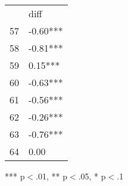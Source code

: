 \documentclass{article}
\begin{document}
\begin{table}[!h]
\centering
\begin{tabular}{ll}
\cline{1-2}
\multicolumn{1}{|l}{} &
  \multicolumn{1}{|l|}{diff} \\
\cline{1-2}
\multicolumn{1}{|l}{57} &
  \multicolumn{1}{|l|}{-0.60***} \\
\cline{1-2}
\multicolumn{1}{|l}{58} &
  \multicolumn{1}{|l|}{-0.81***} \\
\cline{1-2}
\multicolumn{1}{|l}{59} &
  \multicolumn{1}{|l|}{0.15***} \\
\cline{1-2}
\multicolumn{1}{|l}{60} &
  \multicolumn{1}{|l|}{-0.63***} \\
\cline{1-2}
\multicolumn{1}{|l}{61} &
  \multicolumn{1}{|l|}{-0.56***} \\
\cline{1-2}
\multicolumn{1}{|l}{62} &
  \multicolumn{1}{|l|}{-0.26***} \\
\cline{1-2}
\multicolumn{1}{|l}{63} &
  \multicolumn{1}{|l|}{-0.76***} \\
\cline{1-2}
\multicolumn{1}{|l}{64} &
  \multicolumn{1}{|l|}{0.00} \\
\cline{1-2}
\end{tabular}

\footnotesize{
*** p$<$.01, ** p$<$.05, * p$<$.1
}
\end{table}
\end{document}
